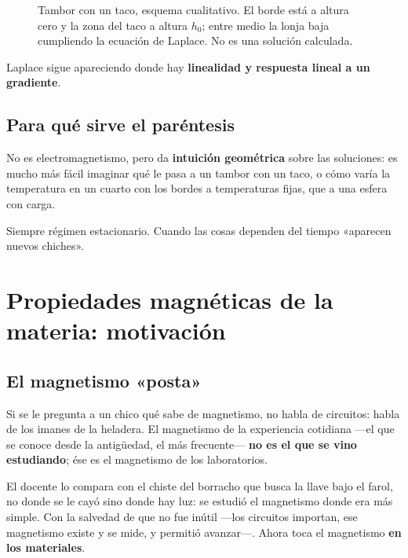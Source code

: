 \documentclass[12pt,a4paper]{article}
\begin{document}
\begin{figure}[H]
  \centering
  
  \caption{Tambor con un taco, esquema cualitativo. El borde está a altura cero y la zona del taco a altura $h_0$; entre medio la lonja baja cumpliendo la ecuación de Laplace. No es una solución calculada.}
\end{figure}

\begin{notebox}[Lo robusto]
Laplace sigue apareciendo donde hay \textbf{linealidad y respuesta
lineal a un gradiente}.
\end{notebox}

\subsection{Para qué sirve el paréntesis}

No es electromagnetismo, pero da \textbf{intuición geométrica} sobre las soluciones:
es mucho más fácil imaginar qué le pasa a un tambor con un taco, o cómo varía
la temperatura en un cuarto con los bordes a temperaturas fijas, que a una
esfera con carga.

\begin{notebox}
Siempre régimen estacionario. Cuando las cosas dependen del tiempo «aparecen
nuevos chiches».
\end{notebox}

\section{Propiedades magnéticas de la materia: motivación}

\subsection{El magnetismo «posta»}

Si se le pregunta a un chico qué sabe de magnetismo, no habla de circuitos:
habla de los imanes de la heladera. El magnetismo de la experiencia cotidiana
---el que se conoce desde la antigüedad, el más frecuente--- \textbf{no es el que se
vino estudiando}; ése es el magnetismo de los laboratorios.

El docente lo compara con el chiste del borracho que busca la llave bajo el
farol, no donde se le cayó sino donde hay luz: se estudió el magnetismo donde
era más simple. Con la salvedad de que no fue inútil ---los circuitos importan,
ese magnetismo existe y se mide, y permitió avanzar---. Ahora toca el magnetismo
\textbf{en los materiales}.
\end{document}
